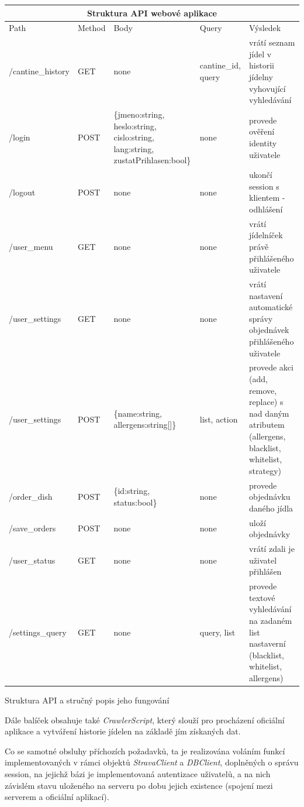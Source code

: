 \documentclass[12pt]{article}
\begin{document}
\begin{listing}[!ht]
\begin{longtable}{ |p{2.8cm}|p{1.4cm}|p{3cm}|p{2cm}|p{4cm}| }
\hline
\multicolumn{5}{|c|}{Struktura API webové aplikace} \\
\hline
Path& Method& Body& Query& Výsledek \\
\hline
/cantine\_history& GET& none& cantine\_id, query& vrátí seznam jídel v historii jídelny vyhovující vyhledávání\\
\hline
/login& POST&  \{jmeno:string, heslo:string, cislo:string, lang:string, zustatPrihlasen:bool\}& none& provede ověření identity uživatele \\
\hline
/logout& POST&  none& none& ukončí session s klientem - odhlášení \\
\hline
/user\_menu& GET&  none& none& vrátí jídelníček právě přihlášeného uživatele \\
\hline
/user\_settings& GET&  none& none& vrátí nastavení automatické správy objednávek přihlášeného uživatele \\
\hline
/user\_settings& POST& \{name:string, allergens:string[]\}& list, action& provede akci (add, remove,  replace) s nad daným atributem (allergens, blacklist, whitelist, strategy) \\
\hline
/order\_dish& POST&  \{id:string, status:bool\}& none& provede objednávku daného jídla \\
\hline
/save\_orders& POST&  none& none& uloží objednávky\\
\hline
/user\_status& GET&  none& none& vrátí zdali je uživatel přihlášen\\
\hline
/settings\_query& GET&  none& query, list& provede textové vyhledávání na zadaném list nastaverní (blacklist, whitelist, allergens)\\
\hline
\end{longtable}
\caption{Struktura API a stručný popis jeho fungování}
\end{listing}

Dále balíček obsahuje také \textit{CrawlerScript}, který slouží pro procházení oficiální aplikace a vytváření historie jídelen na základě jím získaných dat.

Co se samotné obsluhy příchozích požadavků, ta je realizována voláním funkcí implementovaných v rámci objektů \textit{StravaClient} a \textit{DBClient}, doplněných o správu session, na jejichž bázi je implementovaná autentizace uživatelů\cite{auth}, a na nich závislém stavu\cite{state} uloženého na serveru po dobu jejich existence (spojení mezi serverem a oficiální aplikací).
\end{document}

